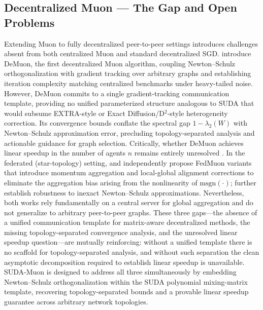 \documentclass[11pt]{article}
\begin{document}
\subsection{Decentralized Muon --- The Gap and Open Problems}

Extending Muon to fully decentralized peer-to-peer settings introduces challenges absent from both centralized Muon and standard decentralized SGD. \citet{he2025demuon} introduce DeMuon, the first decentralized Muon algorithm, coupling Newton--Schulz orthogonalization with gradient tracking over arbitrary graphs and establishing iteration complexity matching centralized benchmarks under heavy-tailed noise. However, DeMuon commits to a single gradient-tracking communication template, providing no unified parameterized structure analogous to SUDA that would subsume EXTRA-style or Exact Diffusion/D$^2$-style heterogeneity correction. Its convergence bounds conflate the spectral gap $1-\lambda_2(W)$ with Newton--Schulz approximation error, precluding topology-separated analysis and actionable guidance for graph selection. Critically, whether DeMuon achieves linear speedup in the number of agents $n$ remains entirely unresolved \citep{he2025demuon}. In the federated (star-topology) setting, \citet{Takezawa2025FedMuonFL} and \citet{liu2025fedmuon} independently propose FedMuon variants that introduce momentum aggregation and local-global alignment corrections to eliminate the aggregation bias arising from the nonlinearity of $\mathrm{msgn}(\cdot)$; \citet{Takezawa2025FedMuonFL} further establish robustness to inexact Newton--Schulz approximations. Nevertheless, both works rely fundamentally on a central server for global aggregation and do not generalize to arbitrary peer-to-peer graphs. These three gaps—the absence of a unified communication template for matrix-aware decentralized methods, the missing topology-separated convergence analysis, and the unresolved linear speedup question—are mutually reinforcing: without a unified template there is no scaffold for topology-separated analysis, and without such separation the clean asymptotic decomposition required to establish linear speedup is unavailable. SUDA-Muon is designed to address all three simultaneously by embedding Newton--Schulz orthogonalization within the SUDA polynomial mixing-matrix template, recovering topology-separated bounds and a provable linear speedup guarantee across arbitrary network topologies.



\end{document}
